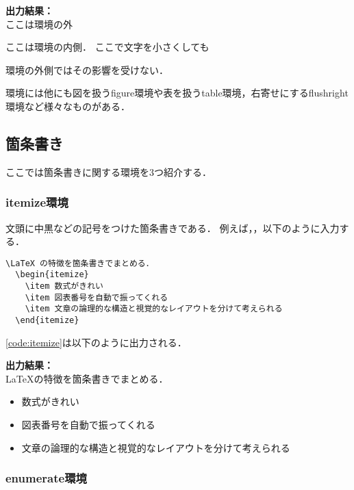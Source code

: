 \noindent\textbf{出力結果：}\hrulefill\\
  ここは環境の外
   \begin{center}
     ここは環境の内側．
     ここで\tiny 文字を小さくしても
   \end{center}
   環境の外側ではその影響を受けない．
\\\noindent\hrulefill 

環境には他にも図を扱うfigure環境や表を扱うtable環境，右寄せにするflushright環境など様々なものがある．

\subsection{箇条書き}

ここでは箇条書きに関する環境を3つ紹介する．

\subsubsection{itemize環境}

文頭に中黒などの記号をつけた箇条書きである．
例えば，，以下のように入力する．
\begin{lstlisting}[caption=itemize環境,label=code:itemize]
  \LaTeX の特徴を箇条書きでまとめる．
  \begin{itemize}
    \item 数式がきれい
    \item 図表番号を自動で振ってくれる
    \item 文章の論理的な構造と視覚的なレイアウトを分けて考えられる
  \end{itemize}
\end{lstlisting}
\code\ref{code:itemize}は以下のように出力される．

\noindent\textbf{出力結果：}\hrulefill\\
  \LaTeX の特徴を箇条書きでまとめる．
  \begin{itemize}
    \item 数式がきれい
    \item 図表番号を自動で振ってくれる
    \item 文章の論理的な構造と視覚的なレイアウトを分けて考えられる
  \end{itemize} 
\noindent\hrulefill 

\subsubsection{enumerate環境}

